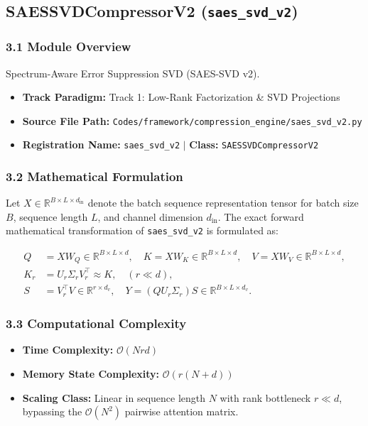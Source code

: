 \subsection{SAESSVDCompressorV2 (\texttt{saes\_svd\_v2})}
\label{sec:app_module_saes\_svd\_v2}

\subsubsection*{3.1 Module Overview}
Spectrum-Aware Error Suppression SVD (SAES-SVD v2).
\begin{itemize}
    \item \textbf{Track Paradigm:} Track 1: Low-Rank Factorization & SVD Projections
    \item \textbf{Source File Path:} \texttt{Codes/framework/compression\_engine/saes\_svd\_v2.py}
    \item \textbf{Registration Name:} \texttt{saes\_svd\_v2} $\mid$ \textbf{Class:} \texttt{SAESSVDCompressorV2}
\end{itemize}

\subsubsection*{3.2 Mathematical Formulation}
Let $X \in \mathbb{R}^{B \times L \times d_{\text{in}}}$ denote the batch sequence representation tensor for batch size $B$, sequence length $L$, and channel dimension $d_{\text{in}}$. The exact forward mathematical transformation of \texttt{saes\_svd\_v2} is formulated as:

\begin{align}
Q &= X W_Q \in \mathbb{R}^{B \times L \times d}, \quad K = X W_K \in \mathbb{R}^{B \times L \times d}, \quad V = X W_V \in \mathbb{R}^{B \times L \times d}, \\
K_r &= U_r \Sigma_r V_r^\top \approx K, \quad (r \ll d), \\
S &= V_r^\top V \in \mathbb{R}^{r \times d_v}, \quad Y = (Q U_r \Sigma_r) S \in \mathbb{R}^{B \times L \times d_v}.
\end{align}


\subsubsection*{3.3 Computational Complexity}
\begin{itemize}
    \item \textbf{Time Complexity:} $\mathcal{O}(N r d)$
    \item \textbf{Memory State Complexity:} $\mathcal{O}(r(N + d))$
    \item \textbf{Scaling Class:} Linear in sequence length $N$ with rank bottleneck $r \ll d$, bypassing the $\mathcal{O}(N^2)$ pairwise attention matrix.
\end{itemize}

